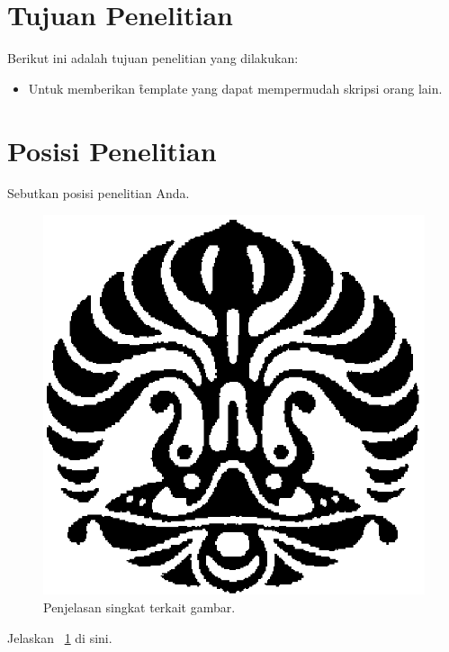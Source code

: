 \section{Tujuan Penelitian}
Berikut ini adalah tujuan penelitian yang dilakukan:
\begin{itemize}
	\item Untuk memberikan \f{template} yang dapat mempermudah skripsi orang lain.
\end{itemize}


\section{Posisi Penelitian}
Sebutkan posisi penelitian Anda.

\begin{figure}
	\centering
	\includegraphics[width=\textwidth]{pics/makara.png}
	\caption{Penjelasan singkat terkait gambar.}
	\label{fig:research_position}
\end{figure}

Jelaskan \pic~\ref{fig:research_position} di sini.


